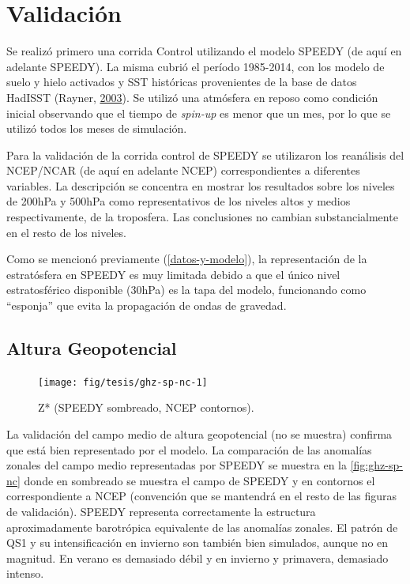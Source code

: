 \documentclass[spanish,a4paper,12pt,oneside]{book}
\begin{document}
\section{Validación}\label{validacion}

Se realizó primero una corrida Control utilizando el modelo SPEEDY (de
aquí en adelante SPEEDY). La misma cubrió el período 1985-2014, con los
modelo de suelo y hielo activados y SST históricas provenientes de la
base de datos HadISST (Rayner,
\protect\hyperlink{ref-Rayner2003}{2003}). Se utilizó una atmósfera en
reposo como condición inicial observando que el tiempo de \emph{spin-up}
es menor que un mes, por lo que se utilizó todos los meses de
simulación.

Para la validación de la corrida control de SPEEDY se utilizaron los
reanálisis del NCEP/NCAR (de aquí en adelante NCEP) correspondientes a
diferentes variables. La descripción se concentra en mostrar los
resultados sobre los niveles de 200hPa y 500hPa como representativos de
los niveles altos y medios respectivamente, de la troposfera. Las
conclusiones no cambian substancialmente en el resto de los niveles.

Como se mencionó previamente (\autoref{datos-y-modelo}), la
representación de la estratósfera en SPEEDY es muy limitada debido a que
el único nivel estratosférico disponible (30hPa) es la tapa del modelo,
funcionando como ``esponja'' que evita la propagación de ondas de
gravedad.

\subsection{Altura Geopotencial}\label{altura-geopotencial-1}

\begin{landscape}\begin{figure}

{\centering \texttt{[image: fig/tesis/ghz-sp-nc-1]} 

}

\caption{Z* (SPEEDY sombreado, NCEP contornos).}\label{fig:ghz-sp-nc}
\end{figure}
\end{landscape}

La validación del campo medio de altura geopotencial (no se muestra)
confirma que está bien representado por el modelo. La comparación de las
anomalías zonales del campo medio representadas por SPEEDY se muestra en
la \autoref{fig:ghz-sp-nc} donde en sombreado se muestra el campo de
SPEEDY y en contornos el correspondiente a NCEP (convención que se
mantendrá en el resto de las figuras de validación). SPEEDY representa
correctamente la estructura aproximadamente barotrópica equivalente de
las anomalías zonales. El patrón de QS1 y su intensificación en invierno
son también bien simulados, aunque no en magnitud. En verano es
demasiado débil y en invierno y primavera, demasiado intenso.
\end{document}
